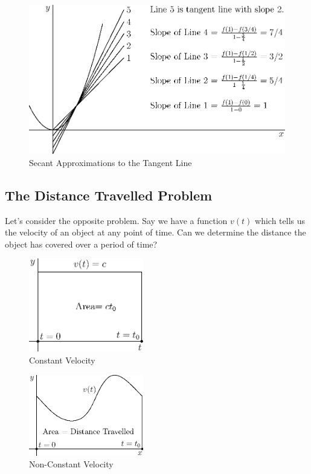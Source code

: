 \documentclass[fleqn]{report}
\begin{document}
\begin{figure}[t]
\centering
\includegraphics[width=12cm]{figure13.eps}
\caption{Secant Approximations to the Tangent Line}
\label{figure-secant-approximations1}
\end{figure}

\subsection{The Distance Travelled Problem}
\label{distance-problem}

Let's consider the opposite problem. Say we have a function
$v(t)$ which tells us the velocity of an object at any point
of time. Can we determine the distance the object has covered
over a period of time? 

\begin{figure}[t]
\centering
\includegraphics[width=5cm]{figure14.eps}
\caption{Constant Velocity}
\label{figure-constant-velocity}
\end{figure}

\begin{figure}[t]
\centering
\includegraphics[width=5cm]{figure15.eps}
\caption{Non-Constant Velocity}
\label{figure-non-constant-velocity}
\end{figure}
\end{document}
